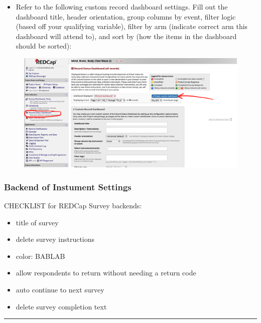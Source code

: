 \documentclass[]{book}
\providecommand{\tightlist}{%
  \setlength{\itemsep}{0pt}\setlength{\parskip}{0pt}}
\begin{document}
\begin{itemize}
\tightlist
\item
  Refer to the following custom record dashboard settings. Fill out the dashboard title, header orientation, group columns by event, filter logic (based off your qualifying variable), filter by arm (indicate correct arm this dashboard will attend to), and sort by (how the items in the dashboard should be sorted):
\end{itemize}

\begin{figure}
\centering
\includegraphics{images/lab_protocols/redcap/6.png}
\caption{}
\end{figure}

\hypertarget{backend-of-instument-settings}{%
\subsubsection{Backend of Instument Settings}\label{backend-of-instument-settings}}

CHECKLIST for REDCap Survey backends:

\begin{itemize}
\tightlist
\item
  title of survey
\item
  delete survey instructions
\item
  color: BABLAB
\item
  allow respondents to return without needing a return code
\item
  auto continue to next survey
\item
  delete survey completion text
\end{itemize}

\begin{center}\rule{0.5\linewidth}{0.5pt}\end{center}
\end{document}
